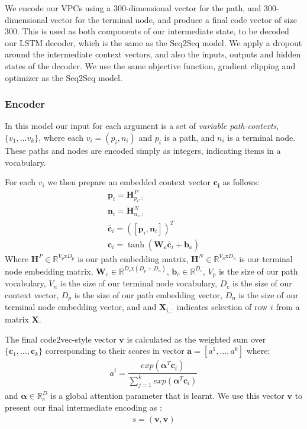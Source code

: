 We encode our VPCs using a 300-dimensional vector for the path, and 300-dimensional vector for the terminal node, and produce a final code vector of size 300.
This is used as both components of our intermediate state, to be decoded our LSTM decoder, which is the same as the Seq2Seq model.
We apply a dropout around the intermediate context vectors, and also the inputs, outputs and hidden states of the decoder. 
We use the same objective function, gradient clipping and optimizer as the Seq2Seq model.

\subsubsection{Encoder}

In this model our input for each argument is a set of \textit{variable path-contexts}, $\{v_1,...v_k\}$, where each $v_i = (p_i, n_i)$ and  $p_i$ is a path, and $n_i$ is a terminal node. These paths and nodes are encoded simply as integers, indicating items in a vocabulary.

For each $v_i$ we then prepare an embedded context vector $\mathbf{c_i}$ as follows:
\begin{align}
\textbf{p}_i = \mathbf{H}^P_{p_i,:}\\
\textbf{n}_i = \mathbf{H}^N_{n_i,:}\\
\tilde{\textbf{c}_i} = ([\textbf{p}_i , \textbf{n}_i])^T \\
\textbf{c}_i = \tanh(\mathbf{W_c}\tilde{\textbf{c}_i}  + \mathbf{b_c})
\end{align}
Where  $\textbf{H}^P \in \mathbb{R}^{V_p\text{x}D_p}$ is our path embedding matrix, 
$\textbf{H}^N \in \mathbb{R}^{V_n\text{x}D_n}$ is our terminal node embedding matrix, 
$\textbf{W}_c \in \mathbb{R}^{D_c\text{x}(D_p+D_n)}$,
$\textbf{b}_c \in \mathbb{R}^{D_c}$,
$V_p$ is the size of our path vocabulary,
$V_n$ is the size of our terminal node vocabulary,
$D_c$ is the size of our context vector,
$D_p$ is the size of our path embedding vector,
$D_n$ is the size of our terminal node embedding vector, and
and $\textbf{X}_{i,:}$ indicates selection of row $i$ from a matrix \textbf{X}.

The final code2vec-style vector $\textbf{v}$ is calculated as the weighted sum over  $\{\textbf{c}_1,...,\textbf{c}_k\}$ corresponding to their scores in vector $\textbf{a} = [a^1,...,a^k]$ where:
\begin{align}
    a^i = \dfrac{exp(\mathbf{\alpha}^{T}\mathbf{c}_i)}{\sum_{j=1}^kexp(\mathbf{\alpha}^{T}\mathbf{c}_i)}
\end{align}
and $\mathbf{\alpha} \in \mathbb{R}^D_c$ is a global attention parameter that is learnt.
We use this vector $\mathbf{v}$ to present our final intermediate encoding as :
\begin{align}
     s = (\mathbf{v}, \mathbf{v}) 
\end{align}


